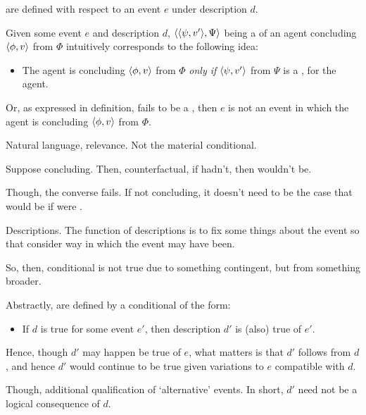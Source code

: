 \begin{note}
   are defined with respect to an event \(e\) under description \(d\).

  Given some event \(e\) and description \(d\), \(\langle \langle \psi, v' \rangle, \Psi \rangle\) being a \requ{} of an agent concluding \(\langle \phi, v \rangle\) from \(\Phi\) intuitively corresponds to the following idea:
  \begin{itemize}
  \item
    The agent is concluding \(\langle \phi, v \rangle\) from \(\Phi\) \emph{only if} \(\langle \psi, v' \rangle\) from \(\Psi\) is a \fc{}, for the agent.
  \end{itemize}

  Or, as expressed in definition, fails to be a \fc{}, then \(e\) is not an event in which the agent is concluding \(\langle \phi, v \rangle\) from \(\Phi\).

  Natural language, relevance.
  Not the material conditional.

  Suppose concluding.
  Then, counterfactual, if hadn't, then wouldn't be.

  Though, the converse fails.
  If not concluding, it doesn't need to be the case that would be if were \fc{}.

  Descriptions.
  The function of descriptions is to fix some things about the event so that consider way in which the event may have been.

  So, then, conditional is not true due to something contingent, but from something broader.

  Abstractly,  are defined by a conditional of the form:
  \begin{itemize}
  \item
    If \(d\) is true for some event \(e'\), then description \(d'\) is (also) true of \(e'\).
  \end{itemize}
  Hence, though \(d'\) may happen be true of \(e\), what matters is that \(d'\) follows from \(d\), and hence \(d'\) would continue to be true given variations to \(e\) compatible with \(d\).

  Though, additional qualification of `alternative' events.
  In short, \(d'\) need not be a logical consequence of \(d\).
\end{note}

